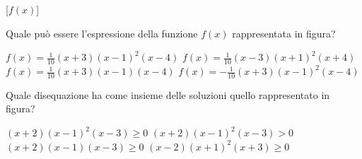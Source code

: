 \documentclass[10pt]{article}
\begin{document}
{\vspace{.8em}
\noindent
\begin{minipage}[c]{.35\linewidth}
  \centering
  \begin{ftplot}[quiz, xmin=-4.9, xmax=4.9, ymin=-4.9, ymax=4.9, legend pos=south east]
    [$f(x)$]
  \end{ftplot}
\end{minipage}\hfill
\begin{minipage}[c]{.64\linewidth}
  \begin{parts}[ragged]
    \itemx[pts=0.5, diff=1] Quale può essere l'espressione della funzione $f(x)$ rappresentata in figura?
      \begin{choices}[cols=1]
        \correct $f(x) = \frac{1}{10}(x+3)(x-1)^2(x-4)$
        \choice $f(x) = \frac{1}{10}(x-3)(x+1)^2(x+4)$
        \choice $f(x) = \frac{1}{10}(x+3)(x-1)(x-4)$
        \choice $f(x) = -\frac{1}{10}(x+3)(x-1)^2(x-4)$
      \end{choices}
  \end{parts}
\end{minipage}

\begin{parts}
  \itemx[pts=0.5, diff=2] Quale disequazione ha come insieme delle soluzioni quello rappresentato in figura?
    \begin{center}
    \end{center}
    \begin{choices}
      \correct $(x+2)(x-1)^2(x-3) \geq 0$
      \choice $(x+2)(x-1)^2(x-3) > 0$
      \choice $(x+2)(x-1)(x-3) \geq 0$
      \choice $(x-2)(x+1)^2(x+3) \geq 0$
    \end{choices}
\end{parts}

}
\end{document}
